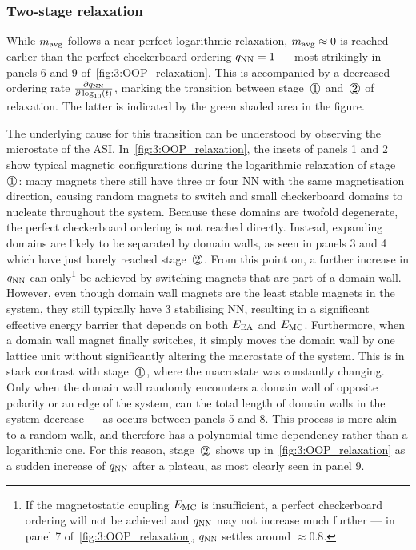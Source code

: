\subsubsection{Two-stage relaxation}
While $m_\mathrm{avg}$ follows a near-perfect logarithmic relaxation, $m_\mathrm{avg} \approx 0$ is reached earlier than the perfect checkerboard ordering $q_\mathrm{NN} = 1$ --- most strikingly in panels 6 and 9 of~\cref{fig:3:OOP_relaxation}.
This is accompanied by a decreased ordering rate $\frac{\partial q_\mathrm{NN}}{\partial \log_{10}(t)}$, marking the transition between stage~$\circled{1}$ and~$\circled{2}$ of relaxation.
The latter is indicated by the green shaded area in the figure. \par
The underlying cause for this transition can be understood by observing the microstate of the ASI.
In~\cref{fig:3:OOP_relaxation}, the insets of panels 1 and 2 show typical magnetic configurations during the logarithmic relaxation of stage~$\circled{1}$: many magnets there still have three or four NN with the same magnetisation direction, causing random magnets to switch and small checkerboard domains to nucleate throughout the system.
Because these domains are twofold degenerate, the perfect checkerboard ordering is not reached directly.
Instead, expanding domains are likely to be separated by domain walls, as seen in panels 3 and 4 which have just barely reached stage~$\circled{2}$.
From this point on, a further increase in $q_\mathrm{NN}$ can only\footnote{
	If the magnetostatic coupling $E_\mathrm{MC}$ is insufficient, a perfect checkerboard ordering will not be achieved and $q_\mathrm{NN}$ may not increase much further --- in panel 7 of~\cref{fig:3:OOP_relaxation}, $q_\mathrm{NN}$ settles around $\approx 0.8$.
} be achieved by switching magnets that are part of a domain wall.
However, even though domain wall magnets are the least stable magnets in the system, they still typically have 3 stabilising NN, resulting in a significant effective energy barrier that depends on both $E_\mathrm{EA}$ and $E_\mathrm{MC}$.
Furthermore, when a domain wall magnet finally switches, it simply moves the domain wall by one lattice unit without significantly altering the macrostate of the system.
This is in stark contrast with stage~$\circled{1}$, where the macrostate was constantly changing.
Only when the domain wall randomly encounters a domain wall of opposite polarity or an edge of the system, can the total length of domain walls in the system decrease --- as occurs between panels 5 and 8.
This process is more akin to a random walk, and therefore has a polynomial time dependency rather than a logarithmic one.
For this reason, stage~$\circled{2}$ shows up in~\cref{fig:3:OOP_relaxation} as a sudden increase of $q_\mathrm{NN}$ after a plateau, as most clearly seen in panel 9. \par
